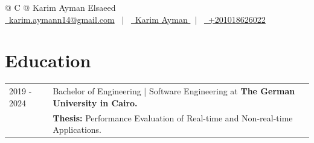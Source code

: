 \documentclass[a4paper,12pt]{article}
\begin{document}
\pagestyle{empty} 



\begin{tabularx}{\linewidth}{@{} C @{}}
\Huge{Karim Ayman Elsaeed} \\[7pt]
\href{mailto:karim.aymann14@gmail.com}{\raisebox{-0.05\height}\faEnvelope \ karim.aymann14@gmail.com} \ $|$ \ 
\href{https://www.linkedin.com/in/karim-ayman-99605b2b8//}{\raisebox{-0.05\height}\faLinkedin\ Karim Ayman } \ $|$ \ 
\href{tel:+20 1018626022}{\raisebox{-0.05\height}\faMobile \ +201018626022} \\
\end{tabularx}




\section{Education}
\begin{tabularx}{\linewidth}{@{}l X@{}}	
2019 - 2024 & Bachelor of Engineering | Software Engineering at \textbf{The German University in Cairo.} \\ 
& \textbf{Thesis:} Performance Evaluation of Real-time and Non-real-time Applications. \\

\end{tabularx}
\end{document}
